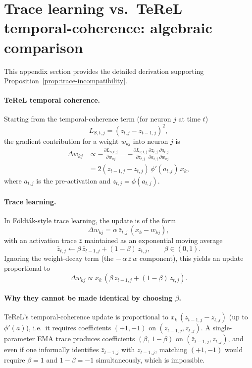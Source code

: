 \section{Trace learning vs.\ TeReL temporal-coherence: algebraic comparison}
\label{app:trace-terel-derivation}

This appendix section provides the detailed derivation supporting Proposition~\ref{prop:trace-incompatibility}.

\paragraph{TeReL temporal coherence.}
Starting from the temporal-coherence term (for neuron $j$ at time $t$)
\begin{equation}
L_{S,t,j} = (z_{t,j}-z_{t-1,j})^2,
\end{equation}
the gradient contribution for a weight $w_{k j}$ into neuron $j$ is
\begin{align}
\Delta w_{k j} &\propto -\frac{\partial L_{S,t,j}}{\partial w_{k j}}
= -\frac{\partial L_{S,t,j}}{\partial z_{t,j}}
\frac{\partial z_{t,j}}{\partial a_{t,j}}
\frac{\partial a_{t,j}}{\partial w_{k j}} \\
&= 2(z_{t-1,j}-z_{t,j}) \, \phi'(a_{t,j}) \, x_k,
\end{align}
where $a_{t,j}$ is the pre-activation and $z_{t,j}=\phi(a_{t,j})$.

\paragraph{Trace learning.}
In F\"oldi\'ak-style trace learning, the update is of the form
\begin{equation}
\Delta w_{k j} = \alpha\,\bar z_{t,j}\,(x_k - w_{k j}),
\end{equation}
with an activation trace $\bar z$ maintained as an exponential moving average
\begin{equation}
\bar z_{t,j} \leftarrow \beta\,\bar z_{t-1,j} + (1-\beta)\,z_{t,j}, \qquad \beta\in(0,1).
\end{equation}
Ignoring the weight-decay term (the $-\,\alpha\,\bar z\,w$ component), this yields an update proportional to
\begin{equation}
\Delta w_{k j} \propto x_k\,(\beta\,\bar z_{t-1,j} + (1-\beta)\,z_{t,j}).
\end{equation}

\paragraph{Why they cannot be made identical by choosing $\beta$.}
TeReL's temporal-coherence update is proportional to $x_k\,(z_{t-1,j}-z_{t,j})$ (up to $\phi'(a)$), i.e.\ it requires coefficients $(+1,-1)$ on $(z_{t-1,j},z_{t,j})$. A single-parameter EMA trace produces coefficients $(\beta,\,1-\beta)$ on $(\bar z_{t-1,j},z_{t,j})$, and even if one informally identifies $\bar z_{t-1,j}$ with $z_{t-1,j}$, matching $(+1,-1)$ would require $\beta=1$ and $1-\beta=-1$ simultaneously, which is impossible.
